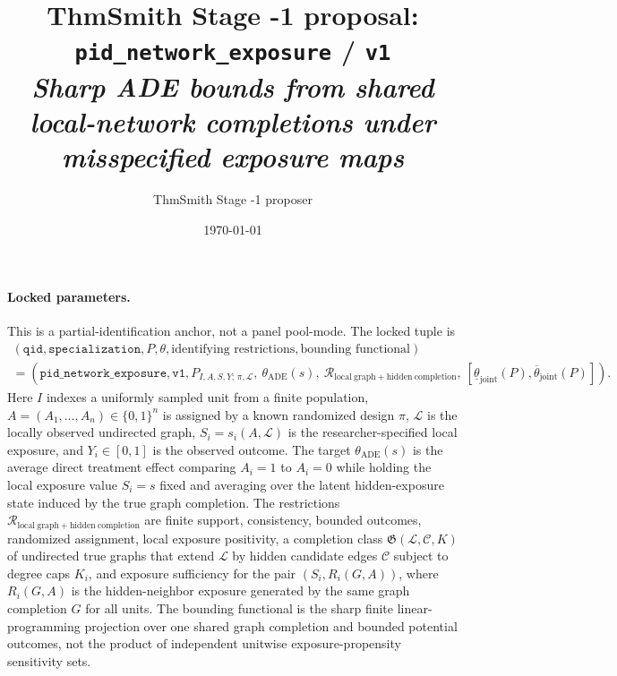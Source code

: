 \documentclass[11pt]{article}
\title{ThmSmith Stage -1 proposal: \texttt{pid\_network\_exposure} / \texttt{v1}%
  \\ \large\textit{Sharp ADE bounds from shared local-network completions under misspecified exposure maps}}
\author{ThmSmith Stage -1 proposer}
\date{\today}
\theoremstyle{definition}
\theoremstyle{plain}
\theoremstyle{remark}
\begin{document}
\maketitle


\paragraph{Locked parameters.}
This is a partial-identification anchor, not a panel pool-mode.  The locked tuple is
\[
\begin{gathered}
(\texttt{qid},\texttt{specialization},P,\theta,\text{identifying restrictions},
  \text{bounding functional})\\
=
(\texttt{pid\_network\_exposure},\texttt{v1},
  P_{I,A,S,Y;\,\pi,\mathcal L},\ \theta_{\mathrm{ADE}}(s),\
  \mathcal{R}_{\mathrm{local\ graph+hidden\ completion}},\
  [\underline\theta_{\mathrm{joint}}(P),\overline\theta_{\mathrm{joint}}(P)]) .
\end{gathered}
\]
Here \(I\) indexes a uniformly sampled unit from a finite population, \(A=(A_1,\ldots,A_n)\in\{0,1\}^n\) is assigned by a known randomized design \(\pi\), \(\mathcal L\) is the locally observed undirected graph, \(S_i=s_i(A,\mathcal L)\) is the researcher-specified local exposure, and \(Y_i\in[0,1]\) is the observed outcome.  The target \(\theta_{\mathrm{ADE}}(s)\) is the average direct treatment effect comparing \(A_i=1\) to \(A_i=0\) while holding the local exposure value \(S_i=s\) fixed and averaging over the latent hidden-exposure state induced by the true graph completion.  The restrictions \(\mathcal{R}_{\mathrm{local\ graph+hidden\ completion}}\) are finite support, consistency, bounded outcomes, randomized assignment, local exposure positivity, a completion class \(\mathfrak G(\mathcal L,\mathcal C,K)\) of undirected true graphs that extend \(\mathcal L\) by hidden candidate edges \(\mathcal C\) subject to degree caps \(K_i\), and exposure sufficiency for the pair \((S_i,R_i(G,A))\), where \(R_i(G,A)\) is the hidden-neighbor exposure generated by the same graph completion \(G\) for all units.  The bounding functional is the sharp finite linear-programming projection over one shared graph completion and bounded potential outcomes, not the product of independent unitwise exposure-propensity sensitivity sets.
\end{document}
